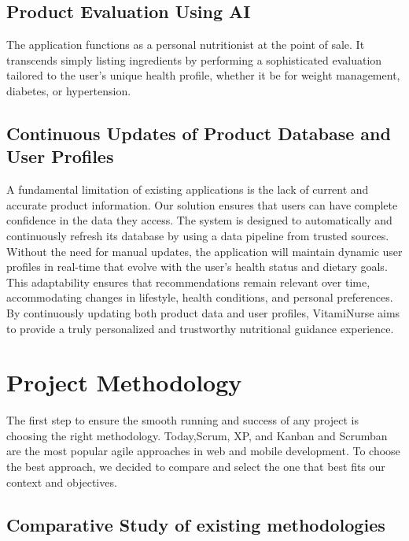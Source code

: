 \subsection{Product Evaluation Using AI}

The application functions as a personal nutritionist at the point of sale.
It transcends simply listing ingredients by performing a sophisticated
evaluation tailored to the user’s unique health profile, whether it be for
weight management, diabetes, or hypertension.


\subsection{Continuous Updates of Product Database and User Profiles}

A fundamental limitation of existing applications is the lack of current
and accurate product information. Our solution ensures that users can
have complete confidence in the data they access. The system is designed
to automatically and continuously refresh its database by using a data
pipeline from trusted sources.
Without the need for manual updates, the application will maintain
dynamic user profiles in real-time that evolve with the user’s health
status and dietary goals. This adaptability ensures that recommendations
remain relevant over time, accommodating changes in lifestyle, health
conditions, and personal preferences. By continuously updating both
product data and user profiles, VitamiNurse aims to provide a truly
personalized and trustworthy nutritional guidance experience.


\section{Project Methodology}

The first step to ensure the smooth running and success of any project
is choosing the right methodology. Today,Scrum, XP, and Kanban and
Scrumban are the most popular agile approaches in web and mobile
development. To choose the best approach, we decided to compare and
select the one that best fits our context and objectives.

\subsection{Comparative Study of existing methodologies}
